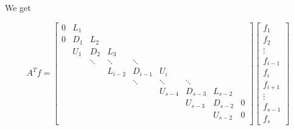 \documentclass[11pt]{article}
\begin{document}
We get

\[ A^Tf = \left[
\begin{array}{ccccccccc}
0 & L_{1}    &       &           &           &           &       &         & \\
0 & D_{1}    & L_{2}     &           &           &           &       &         & \\
      & U_{1} & D_{2}    & L_{3}     &           &           &           &         & \\
      &       & \ddots   & \ddots    & \ddots    &           &           &         & \\
      &       &          & L_{i-2}   & D_{i-1}   & U_{i}     &           &         & \\
      &       &          &           & \ddots    & \ddots    & \ddots    &         & \\
      &       &          &           &           & U_{s-4}   & D_{s-3}   & L_{s-2} & \\
      &      &       &          &           &           & U_{s-3}   & D_{s-2}   & 0 \\
  &      &       &           &           &           &       &      U_{s-2}  & 0 \\
\end{array} \right] 
\left[ \begin{array}{c}
f_{1} \\ f_{2} \\ \vdots \\ f_{i-1} \\ f_{i} \\ f_{i+1} \\ \vdots \\ f_{s-1} \\ f_{s}
\end{array} \right]
\]
\end{document}
